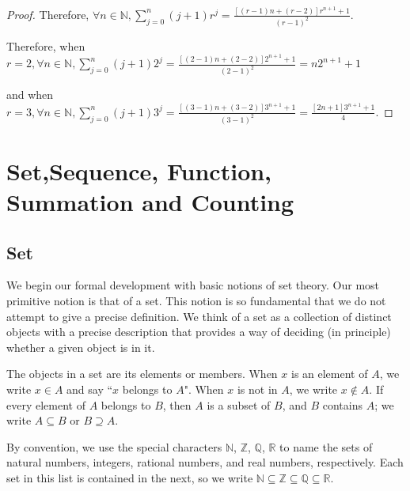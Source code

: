 \documentclass[
	12pt, %
	fleqn, %
	a4paper, %
]{LegrandOrangeBook}
\begin{document}
\begin{proof}
Therefore, \( \forall n \in \mathbb{N}, \sum_{j=0}^{n} (j + 1)r^j = \frac{[(r - 1)n + (r - 2)]r^{n+1} + 1}{(r - 1)^2} \).

Therefore, when \( r = 2, \forall n \in \mathbb{N}, \sum_{j=0}^{n} (j + 1)2^j = \frac{[(2 - 1)n + (2 - 2)]2^{n+1} + 1}{(2 - 1)^2} = n2^{n+1} + 1 \)

and when \( r = 3, \forall n \in \mathbb{N}, \sum_{j=0}^{n} (j + 1)3^j = \frac{[(3 - 1)n + (3 - 2)]3^{n+1} + 1}{(3 - 1)^2} = \frac{[2n + 1]3^{n+1} + 1}{4} \).
\end{proof}






\chapterspaceabove{6.75cm} 
\chapterspacebelow{7.25cm} 
\chapter{Set,Sequence, Function, Summation and Counting}
\section{Set}
    We begin our formal development with basic notions of set theory. Our most primitive notion is that of a set. This notion is so fundamental that we do not attempt to give a precise definition. We think of a set as a collection of distinct objects with a precise description that provides a way of deciding (in principle) whether a given object is in it.

\begin{definition}[Set]
The objects in a set are its elements or members. When \( x \) is an element of \( A \), we write \( x \in A \) and say ``\( x \) belongs to \( A \)". When \( x \) is not in \( A \), we write \( x \notin A \). If every element of \( A \) belongs to \( B \), then \( A \) is a subset of \( B \), and \( B \) contains \( A \); we write \( A \subseteq B \) or \( B \supseteq A \).
\end{definition}

\begin{remark}
By convention, we use the special characters \( \mathbb{N} \), \( \mathbb{Z} \), \( \mathbb{Q} \), \( \mathbb{R} \) to name the sets of natural numbers, integers, rational numbers, and real numbers, respectively. Each set in this list is contained in the next, so we write \( \mathbb{N} \subseteq \mathbb{Z} \subseteq \mathbb{Q} \subseteq \mathbb{R} \).
\end{remark}
\end{document}
